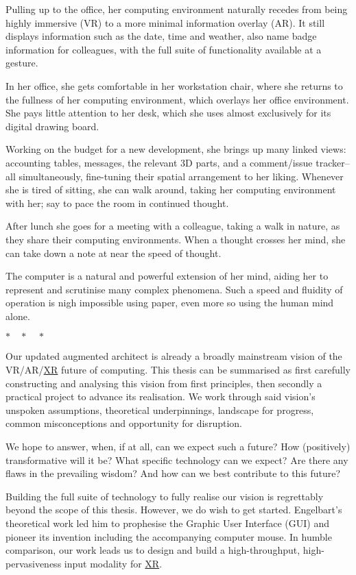 \documentclass[logo,bsc,singlespacing,parskip]{infthesis}
\newcommand{\threestars}{\begin{center}$ {\ast}\quad{\ast}\quad{\ast} $\end{center}}
\begin{document}
Pulling up to the office, her computing environment naturally recedes from being highly immersive (VR) to a more minimal information overlay (AR).
It still displays information such as the date, time and weather, also name badge information for colleagues, with the full suite of functionality available at a gesture.

In her office, she gets comfortable in her workstation chair, where she returns to the fullness of her computing environment, which overlays her office environment.
She pays little attention to her desk, which she uses almost exclusively for its digital drawing board.

Working on the budget for a new development, she brings up many linked views: accounting tables, messages, the relevant 3D parts, and a comment/issue tracker-- all simultaneously, fine-tuning their spatial arrangement to her liking.
Whenever she is tired of sitting, she can walk around, taking her computing environment with her; say to pace the room in continued thought.

After lunch she goes for a meeting with a colleague, taking a walk in nature, as they share their computing environments.
When a thought crosses her mind, she can take down a note at near the speed of thought.

The computer is a natural and powerful extension of her mind, aiding her to represent and scrutinise many complex phenomena.
Such a speed and fluidity of operation is nigh impossible using paper, even more so using the human mind alone.

\threestars
Our updated augmented architect is already a broadly mainstream vision of the VR/AR/\hyperref[org39cbd51]{XR} future of computing.
This thesis can be summarised as first carefully constructing and analysing this vision from first principles, then secondly a practical project to advance its realisation.
We work through said vision's unspoken assumptions, theoretical underpinnings, landscape for progress, common misconceptions and opportunity for disruption.

We hope to answer, when, if at all, can we expect such a future?
How (positively) transformative will it be?
What specific technology can we expect?
Are there any flaws in the prevailing wisdom? 
And how can we best contribute to this future?

Building the full suite of technology to fully realise our vision is regrettably beyond the scope of this thesis.
However, we do wish to get started.
Engelbart's theoretical work \autocite{engelbartAugmentingHumanIntellect1962}  led him to prophesise the Graphic User Interface (GUI) and pioneer its invention including the accompanying computer mouse.
In humble comparison, our work leads us to design and build a high-throughput, high-pervasiveness input modality for \hyperref[org39cbd51]{XR}.
\end{document}
